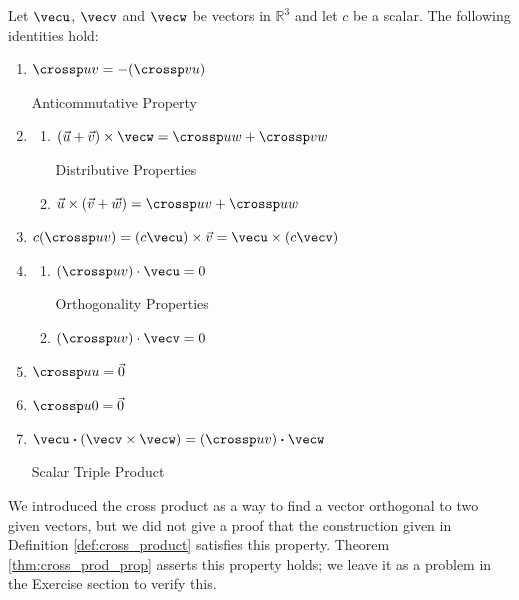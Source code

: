 \setboxwidth{15pt}
{Let $\vecu$, $\vecv$ and $\vecw$ be vectors in $\mathbb{R}^3$ and let $c$ be a scalar. The following identities hold:
\begin{enumerate}
	\item \parbox{167pt}{$\crossp uv = -(\crossp vu)$} Anticommutative Property
	\item	\begin{enumerate}
		\item \parbox{145pt}{$(\vec u+\vec v)\times \vecw = \crossp uw+\crossp vw$} Distributive Properties
		\item	$\vec u \times (\vec v+\vec w) = \crossp uv+\crossp uw$
	\end{enumerate}
	\item		$c(\crossp uv) = (c\vecu) \times \vec v = \vecu \times (c\vecv)$
	\item		\begin{enumerate}
		\item \parbox{145pt}{$(\crossp uv)\cdot \vecu = 0$} Orthogonality Properties
		\item	$(\crossp uv)\cdot \vecv = 0$
	\end{enumerate}
	\item		$\crossp uu = \vec 0$
	\item		$\crossp u0 = \vec 0$
	\item		\parbox{167pt}{$\vecu \boldsymbol{\cdot} (\vecv\times\vecw) = (\crossp uv)\boldsymbol{\cdot} \vecw$} Scalar Triple Product
\end{enumerate}
}
\restoreboxwidth

We introduced the cross product as a way to find a vector orthogonal to two given vectors, but we did not give a proof that the construction given in Definition \ref{def:cross_product} satisfies this property. Theorem \ref{thm:cross_prod_prop} asserts this property holds; we leave it as a problem in the Exercise section to verify this.

